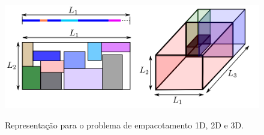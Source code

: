 \begin{figure}[!htb]
    \centering
    \caption{Representação para o problema de empacotamento 1D, 2D e 3D.}
    \includegraphics[scale=1]{utils/images/packing-example}
    \label{fig:packing-example}
\end{figure}
